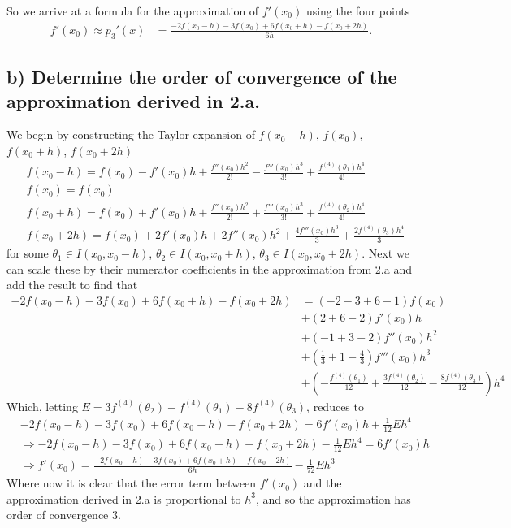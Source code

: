 \documentclass[11pt, letterpaper]{article}
\begin{document}
So we arrive at a formula for the approximation of $f'(x_0)$ using the four points
\begin{align*}
    f'(x_0)\approx p_3'(x)&=\frac{-2f(x_0-h)-3f(x_0)+6f(x_0+h)-f(x_0+2h)}{6h}.
\end{align*}
\subsection*{b) \normalfont Determine the order of convergence of the approximation derived in 2.a.}
We begin by constructing the Taylor expansion of $f(x_0-h)$, $f(x_0)$, $f(x_0+h)$, $f(x_0+2h)$
\begin{align*}
    &f(x_0-h)=f(x_0)-f'(x_0)h+\frac{f''(x_0)h^2}{2!}-\frac{f'''(x_0)h^3}{3!}+\frac{f^{(4)}(\theta_1)h^4}{4!}\\
    &f(x_0)=f(x_0)\\
    &f(x_0+h)=f(x_0)+f'(x_0)h+\frac{f''(x_0)h^2}{2!}+\frac{f'''(x_0)h^3}{3!}+\frac{f^{(4)}(\theta_2)h^4}{4!}\\
    &f(x_0+2h)=f(x_0)+2f'(x_0)h+2f''(x_0)h^2+\frac{4f'''(x_0)h^3}{3}+\frac{2f^{(4)}(\theta_3)h^4}{3}
\end{align*}
for some $\theta_1\in I(x_0,x_0-h)$, $\theta_2\in I(x_0,x_0+h)$, $\theta_3\in I(x_0,x_0+2h)$. Next we can scale
these by their numerator coefficients in the approximation from 2.a and add the result to find that
\begin{align*}
    -2f(x_0-h)-3f(x_0)+6f(x_0+h)-f(x_0+2h)&=(-2-3+6-1)f(x_0)\\
    &+(2+6-2)f'(x_0)h\\
    &+(-1+3-2)f''(x_0)h^2\\
    &+(\frac{1}{3}+1-\frac{4}{3})f'''(x_0)h^3\\
    &+(-\frac{f^{(4)}(\theta_1)}{12}+\frac{3f^{(4)}(\theta_2)}{12}-\frac{8f^{(4)}(\theta_3)}{12})h^4
\end{align*}
Which, letting $E=3f^{(4)}(\theta_2)-f^{(4)}(\theta_1)-8f^{(4)}(\theta_3)$, reduces to
\begin{align*}
    &-2f(x_0-h)-3f(x_0)+6f(x_0+h)-f(x_0+2h)=6f'(x_0)h+\frac{1}{12}Eh^4\\
    &\Rightarrow -2f(x_0-h)-3f(x_0)+6f(x_0+h)-f(x_0+2h)-\frac{1}{12}Eh^4=6f'(x_0)h\\
    &\Rightarrow f'(x_0)=\frac{-2f(x_0-h)-3f(x_0)+6f(x_0+h)-f(x_0+2h)}{6h}-\frac{1}{72}Eh^3
\end{align*}
Where now it is clear that the error term between $f'(x_0)$ and the approximation derived in 2.a is proportional
to $h^3$, and so the approximation has order of convergence $3$.\newpage
\end{document}
